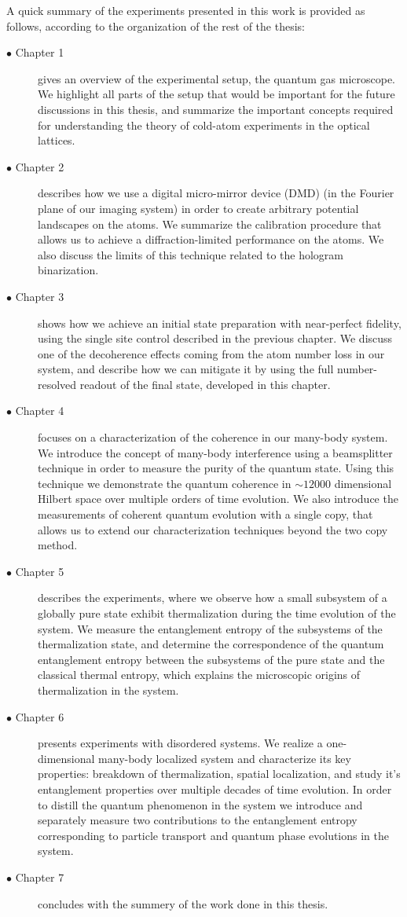 A quick summary of the experiments presented in this work is provided as follows, according to the organization of the rest of the thesis:
\begin{description}
	\item[$\bullet$ Chapter 1] gives an overview of the experimental setup, the quantum gas microscope. We highlight all parts of the setup that would be important for the future discussions in this thesis, and summarize the important concepts required for understanding the theory of cold-atom experiments in the optical lattices.
	\item[$\bullet$ Chapter 2] describes how we use a digital micro-mirror device (DMD) (in the Fourier plane of our imaging system) in order to create arbitrary potential landscapes on the atoms. We summarize the calibration procedure that allows us to achieve a diffraction-limited performance on the atoms. We also discuss the limits of this technique related to the hologram binarization.
	\item[$\bullet$ Chapter 3] shows how we achieve an initial state preparation with near-perfect fidelity, using the single site control described in the previous chapter. We discuss one of the decoherence effects coming from the atom number loss in our system, and describe how we can mitigate it by using the full number-resolved readout of the final state, developed in this chapter.
	\item[$\bullet$ Chapter 4] focuses on a characterization of the coherence in our many-body system. We introduce the concept of many-body interference using a beamsplitter technique in order to measure the purity of the quantum state. Using this technique we demonstrate the quantum coherence in $\sim12000$ dimensional Hilbert space over multiple orders of time evolution. We also introduce the measurements of coherent quantum evolution with a single copy, that allows us to extend our characterization techniques beyond the two copy method. 
	\item[$\bullet$ Chapter 5] describes the experiments, where we observe how a small subsystem of a globally pure state exhibit thermalization during the time evolution of the system. We measure the entanglement entropy of the subsystems of the thermalization state, and determine the correspondence of the quantum entanglement entropy between the subsystems of the pure state and the classical thermal entropy, which explains the microscopic origins of thermalization in the system.
	\item[$\bullet$ Chapter 6] presents experiments with disordered systems. We realize a one-dimensional many-body localized system and characterize its key properties: breakdown of thermalization, spatial localization, and study it's entanglement properties over multiple decades of time evolution. In order to distill the quantum phenomenon in the system we introduce and separately measure two contributions to the entanglement entropy corresponding to particle transport and quantum phase evolutions in the system.
	 \item[$\bullet$ Chapter 7] concludes with the summery of the work done in this thesis.
\end{description}